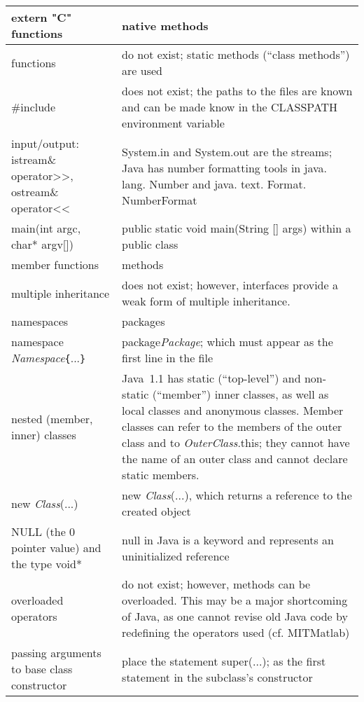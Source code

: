 \documentclass[12pt]{article}
\renewcommand{\allowbreak}{ } %
\newcommand{\threedots}{...}
\newcommand{\mycr}{\\\hline}
\newlength{\colwidth}\setlength{\colwidth}{\textwidth}
\newenvironment{mytabular}%
{\par\noindent
\begin{longtable}[l]{%
|p{\colwidth}%
p{\colwidth}|%
}%
}%
{\end{longtable}\par\vspace{\medskipamount}\goodbreak}
\newenvironment{mytabular}
{
\begin{tabular}[t]{|ll|}
}
{
\end{tabular}
}
\newcommand{\code}[1]{{\ttfamily #1}}
\newcommand{\ital}[1]{{{\normalfont\itshape #1}}}%
\begin{document}
\begin{mytabular}
\code{extern "C"} functions &
  \code{native} methods \mycr

functions & do not exist; \code{static} methods (``class
            methods'') are used \mycr

\code{\#include} & does not exist;
the paths to the files are known and can be
made know in the \code{CLASSPATH} environment
variable \mycr

input/output: \code{istream\& operator>>},
   \code{ostream\& operator<<} &
   \code{System.in} and \code{System.out} are the streams;
   Java has number formatting tools in
   \code{java.\allowbreak lang.\allowbreak Number}
   and \code{java.\allowbreak text.\allowbreak Format.\allowbreak NumberFormat}
  \mycr

\code{main(int argc, char* argv[])}
  & \code{public static void main(String [] args)}
    within a \code{public} class \mycr

member functions & methods \mycr

multiple inheritance & does not exist; however,
interfaces provide a weak form of multiple inheritance.\mycr

namespaces & packages \mycr

\code{namespace \ital{Namespace}}\verb!{!\threedots\verb!}!
   & \code{package}\ital{Package}\code{;} which must appear
     as the first line in the file \mycr

nested (member, inner) classes &
  Java~1.1 has \code{static} (``top-level'')
  and non-static (``member'') inner classes, as well
  as local classes and anonymous classes. Member classes
  can refer to the members of the outer class
  and to \ital{OuterClass}\code{.this};
  they cannot have the name of an outer class
  and cannot declare \code{static} members.\mycr

\code{new} \ital{Class}\code{(}\threedots\code{)} &
   \code{new} \ital{Class}\code{(}\threedots\code{)}, which
   returns a reference to the created object\mycr

\code{NULL} (the 0 pointer value) and the type
  \code{void*} & \code{null} in Java is a keyword and
  represents an uninitialized reference \mycr

overloaded operators & do not exist; however, methods
  can be overloaded.  This may be a major shortcoming of
  Java, as one cannot revise old Java code by redefining
  the operators used (cf. MITMatlab) \mycr

passing arguments to base class constructor &
  place the statement \code{super(}\threedots\code{);} as the
  first statement in the subclass's constructor\mycr


\end{mytabular}
\end{document}

